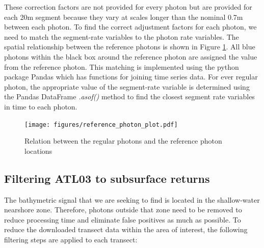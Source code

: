 These correction factors are not provided for every photon but are provided for each 20m segment because they vary at scales longer than the nominal 0.7m between each photon. To find the correct adjustment factors for each photon, we need to match the segment-rate variables to the photon rate variables. The spatial relationship between the reference photons is shown in Figure \ref{fig:reference-photon_match}. All blue photons within the black box around the reference photon are assigned the value from the reference photon. This matching is implemented using the python package Pandas \parencite{jeff_reback_2022_6408044,mckinney-proc-scipy-2010} which has functions for joining time series data. For ever regular photon, the appropriate value of the segment-rate variable is determined using the Pandas DataFrame \emph{.asof()} method to find the closest segment rate variables in time to each photon. 

\begin{figure}[h]
    \centering
    \texttt{[image: figures/reference\_photon\_plot.pdf]}
    \caption{Relation between the regular photons and the reference photon locations}
    \label{fig:reference-photon_match} 
\end{figure}

\subsection{Filtering ATL03 to subsurface returns}\label{subsec:subsurface-filtering}

The bathymetric signal that we are seeking to find is located in the shallow-water nearshore zone. Therefore, photons outside that zone need to be removed to reduce processing time and eliminate false positives as much as possible. To reduce the downloaded transect data within the area of interest, the following filtering steps are applied to each transect:

